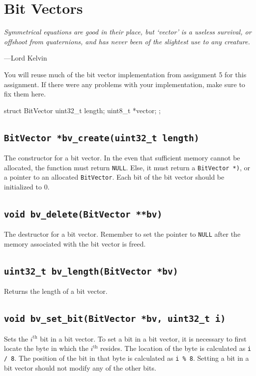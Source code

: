\documentclass{article}
\begin{document}
\section{Bit Vectors}

\epigraph{\emph{Symmetrical equations are good in their place, but `vector'
is a useless survival, or offshoot from quaternions, and has never been of the
slightest use to any creature.}}{---Lord Kelvin}

\noindent You will reuse much of the bit vector implementation from assignment 5
for this assignment. If there were any problems with your
implementation, make sure to fix them here.

\begin{codelisting}{}
struct BitVector {
  uint32_t length;
  uint8_t *vector;
};
\end{codelisting}

\subsection{\texttt{BitVector *bv\_create(uint32\_t length)}}

The constructor for a bit vector. In the even that sufficient memory
cannot be allocated, the function must return \texttt{NULL}. Else, it
must return a \texttt{BitVector *)}, or a pointer to an allocated
\texttt{BitVector}. Each bit of the bit vector should be initialized to
0.

\subsection{\texttt{void bv\_delete(BitVector **bv)}}

The destructor for a bit vector. Remember to set the pointer to
\texttt{NULL} after the memory associated with the bit vector is freed.

\subsection{\texttt{uint32\_t bv\_length(BitVector *bv)}}

Returns the length of a bit vector.

\subsection{\texttt{void bv\_set\_bit(BitVector *bv, uint32\_t i)}}

Sets the $i^\text{th}$ bit in a bit vector. To set a bit in a bit
vector, it is necessary to first locate the byte in which the
$i^\text{th}$ resides. The location of the byte is calculated as
\texttt{i / 8}. The position of the bit in that byte is calculated as
\texttt{i \% 8}. Setting a bit in a bit vector should not modify any of
the other bits.
\end{document}
